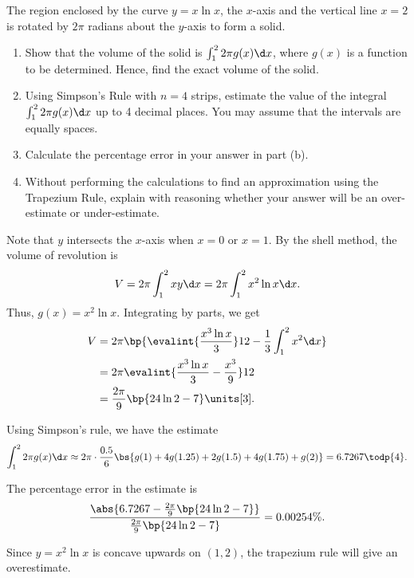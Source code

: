 \begin{problem}
    The region enclosed by the curve $y = x \ln x$, the $x$-axis and the vertical line $x = 2$ is rotated by $2\pi$ radians about the $y$-axis to form a solid.

    \begin{enumerate}
        \item Show that the volume of the solid is $\int_1^2 2\pi g(x) \d x$, where $g(x)$ is a function to be determined. Hence, find the exact volume of the solid.
        \item Using Simpson's Rule with $n = 4$ strips, estimate the value of the integral $\int_1^2 2\pi g(x) \d x$ up to 4 decimal places. You may assume that the intervals are equally spaces.
        \item Calculate the percentage error in your answer in part (b).
        \item Without performing the calculations to find an approximation using the Trapezium Rule, explain with reasoning whether your answer will be an over-estimate or under-estimate.
    \end{enumerate}
\end{problem}
\begin{solution}
    \begin{ppart}
        Note that $y$ intersects the $x$-axis when $x = 0$ or $x = 1$. By the shell method, the volume of revolution is \[V = 2\pi \int_1^2 xy \d x = 2\pi \int_1^2 x^2 \ln x \d x.\] Thus, $g(x) = x^2 \ln x$. Integrating by parts, we get
        \begin{align*}
            V &= 2\pi \bp{\evalint{\frac{x^3 \ln x}{3}}12 - \frac{1}{3} \int_1^2 x^2 \d x}\\
            &= 2\pi \evalint{\frac{x^3 \ln x}{3} - \frac{x^3}{9}}12\\
            &= \frac{2\pi}{9} \bp{24 \ln 2 - 7} \units[3].
        \end{align*}
    \end{ppart}
    \begin{ppart}
        Using Simpson's rule, we have the estimate \[\int_1^2 2\pi g(x) \d x \approx 2\pi \cdot \frac{0.5}{6} \bs{g(1) + 4g(1.25) + 2g(1.5) + 4g(1.75) + g(2)} = 6.7267 \todp{4}.\]
    \end{ppart}
    \begin{ppart}
        The percentage error in the estimate is \[\frac{\abs{6.7267 - \frac{2\pi}{9} \bp{24 \ln 2 - 7}}}{\frac{2\pi}{9} \bp{24 \ln 2 - 7}} = 0.00254\%.\]
    \end{ppart}
    \begin{ppart}
        Since $y = x^2 \ln x$ is concave upwards on $(1, 2)$, the trapezium rule will give an overestimate.
    \end{ppart}
\end{solution}

